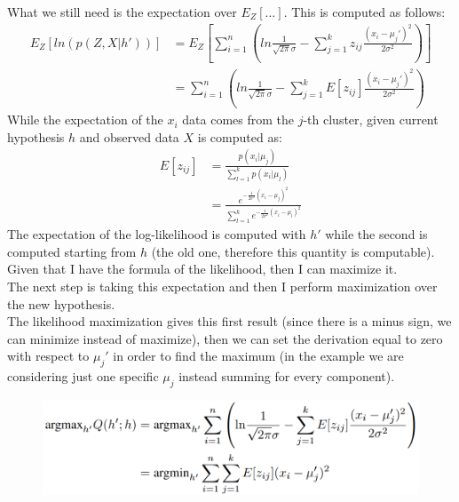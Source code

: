             What we still need is the expectation over $E_Z[\dots]$. This is computed as follows: 
            \begin{align*}
                E_Z [ln ( p (Z, X| h'))] & = E_Z 
                                            \left[ \sum _{i=1} ^ n \left(
                                            ln \frac{1}{\sqrt{2 \pi} \sigma}
                                            - \sum _{j=1} ^k z_{ij}
                                                \frac{(x_i - \mu_j ' )^2}{2 \sigma ^ 2}
                                            \right) \right]\\
                                        & = \sum _{i = 1} ^ n 
                                        \left( 
                                        ln \frac{1}{\sqrt{2 \pi} \sigma}
                                        - \sum _{j=1} ^k E [z_{ij}]
                                                \frac{(x_i - \mu_j ' )^2}{2 \sigma ^ 2}
                                        \right)
            \end{align*}    
            While the expectation of the $x_i$ data comes from the $j$-th cluster, given current hypothesis $h$ and observed data $X$ is computed as:
            \begin{align*}
                E[z_{ij}]   &= \frac{p(x_i | \mu_j)}{\sum _{l=1} ^ k p(x_i | \mu_l)}\\
                            &= 
                            \frac   {e^{- \frac{1}{2 \sigma^ 2} (x_i -\mu_j)^2 }}
                                    { \sum _{l=1} ^ k e^{- \frac{1}{2 \sigma^ 2} (x_i - \mu_l)^2 }}
            \end{align*}
            The expectation of the log-likelihood is computed with $h'$ while the second is computed starting from $h$ (the old one, therefore this quantity is computable). Given that I have the formula of the likelihood, then I can maximize it.\\
            The next step is taking this expectation and then I perform maximization over the new hypothesis. \\
            The likelihood maximization gives this first result (since there is a minus sign, we can minimize instead of maximize), then we can set the derivation equal to zero with respect to $\mu_j '$ in order to find the maximum (in the example we are considering just one specific $\mu_j$ instead summing for every component).
            \begin{figure} [ht]
                \centering
                \includegraphics[scale=0.4]{images/m-step_GMM_maximization.png}
            \end{figure}
